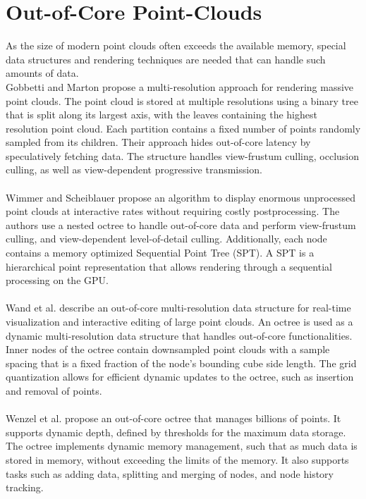 \section {Out-of-Core Point-Clouds}
\label{sec:related_work_point_clouds}
As the size of modern point clouds often exceeds the available memory, special data structures and rendering techniques are needed that can handle such amounts of data. 
\\
Gobbetti and Marton \cite{gobbetti2004layered} propose a multi-resolution approach for rendering massive point clouds. The point cloud is stored at multiple resolutions using a binary tree that is split along its largest axis, with the leaves containing the highest resolution point cloud. Each partition contains a fixed number of points randomly sampled from its children. Their approach hides out-of-core latency by speculatively fetching data. The structure handles view-frustum culling, occlusion culling, as well as view-dependent progressive transmission.
\\
\\
Wimmer and Scheiblauer \cite{wimmer2006instant} propose an algorithm to display enormous unprocessed point clouds at interactive rates without requiring costly postprocessing. The authors use a nested octree to handle out-of-core data and perform view-frustum culling, and view-dependent level-of-detail culling. Additionally, each node contains a memory optimized Sequential Point Tree (SPT). A SPT is a hierarchical point representation that allows rendering through a sequential processing on the GPU.  
\\
\\
Wand et al. \cite{wand2007interactive} describe an out-of-core multi-resolution data structure for real-time visualization and interactive editing of large point clouds. An octree is used as a dynamic multi-resolution data structure that handles out-of-core functionalities. Inner nodes of the octree contain downsampled point clouds with a sample spacing that is a fixed fraction of the node's bounding cube side length. The grid quantization allows for efficient dynamic updates to the octree, such as insertion and removal of points. 
\\
\\
Wenzel et al. \cite{wenzel2014out} propose an out-of-core octree that manages billions of points. It supports dynamic depth, defined by thresholds for the maximum data storage. The octree implements dynamic memory management, such that as much data is stored in memory, without exceeding the limits of the memory. It also supports tasks such as adding data, splitting and merging of nodes, and node history tracking. 
